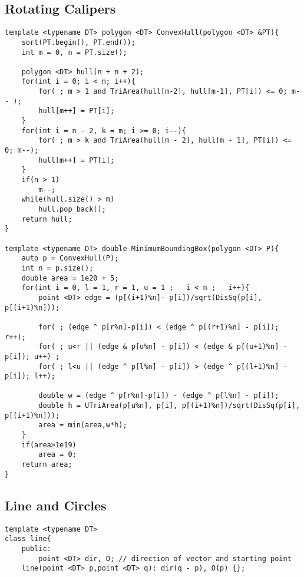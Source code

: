 \documentclass[10pt,a4paper,onesided]{article}
\begin{document}
\begin{multicols*}{3}
\subsection{Rotating Calipers}
\begin{lstlisting}
template <typename DT> polygon <DT> ConvexHull(polygon <DT> &PT){
    sort(PT.begin(), PT.end());
    int m = 0, n = PT.size();
    
    polygon <DT> hull(n + n + 2);
    for(int i = 0; i < n; i++){ 
        for( ; m > 1 and TriArea(hull[m-2], hull[m-1], PT[i]) <= 0; m-- );
        hull[m++] = PT[i];
    }
    for(int i = n - 2, k = m; i >= 0; i--){
        for( ; m > k and TriArea(hull[m - 2], hull[m - 1], PT[i]) <= 0; m--);
        hull[m++] = PT[i];
    }
    if(n > 1) 
        m--;
    while(hull.size() > m) 
        hull.pop_back();
    return hull;
}

template <typename DT> double MinimumBoundingBox(polygon <DT> P){
    auto p = ConvexHull(P);
    int n = p.size();
    double area = 1e20 + 5;
    for(int i = 0, l = 1, r = 1, u = 1 ;   i < n ;   i++){
        point <DT> edge = (p[(i+1)%n]- p[i])/sqrt(DisSq(p[i], p[(i+1)%n]));

        for( ; (edge ^ p[r%n]-p[i]) < (edge ^ p[(r+1)%n] - p[i]); r++); 
        for( ; u<r || (edge & p[u%n] - p[i]) < (edge & p[(u+1)%n] - p[i]); u++) ;
        for( ; l<u || (edge ^ p[l%n] - p[i]) > (edge ^ p[(l+1)%n] - p[i]); l++);
        
        double w = (edge ^ p[r%n]-p[i]) - (edge ^ p[l%n] - p[i]);
        double h = UTriArea(p[u%n], p[i], p[(i+1)%n])/sqrt(DisSq(p[i], p[(i+1)%n]));
        area = min(area,w*h);
    }
    if(area>1e19) 
        area = 0;
    return area;
}
\end{lstlisting}
\subsection{Line and Circles}
\begin{lstlisting}
template <typename DT>
class line{
    public:
        point <DT> dir, O; // direction of vector and starting point
    line(point <DT> p,point <DT> q): dir(q - p), O(p) {};


\end{lstlisting}
\end{multicols*}
\end{document}
